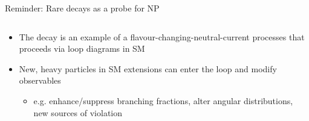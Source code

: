 \documentclass[aspectratio=1610]{beamer}
\begin{document}
\begin{frame}{Reminder: Rare decays as a probe for NP}
  \begin{columns}
    \begin{column}{0.6\textwidth}
      \begin{itemize}
      \item The decay \BdToKpimm is an example of a \btosmm flavour-changing-neutral-current processes that proceeds via loop diagrams in SM
      \item New, heavy particles in SM extensions can enter the loop and modify observables 
      \begin{itemize}
        \item e.g. enhance/suppress branching fractions, alter angular distributions, new sources of \CP violation
      \end{itemize}
      \end{itemize}
    \end{column}
    

\end{columns}
\end{frame}
\end{document}
